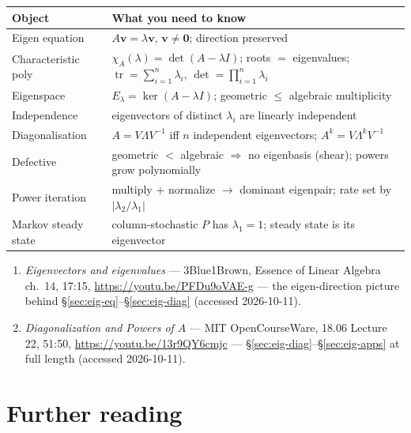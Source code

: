 \begin{center}
\begin{tabularx}{\textwidth}{l>{\raggedright\arraybackslash}X}
\toprule
\textbf{Object} & \textbf{What you need to know}\\
\midrule
Eigen equation & $A\mathbf v=\lambda\mathbf v$, $\mathbf v\ne\mathbf0$;
direction preserved \\
Characteristic poly & $\chi_A(\lambda)=\det(A-\lambda I)$; roots $=$
eigenvalues; $\operatorname{tr}=\sum_{i=1}^{n}\lambda_i$, $\det=\prod_{i=1}^{n}\lambda_i$ \\
Eigenspace & $E_\lambda=\ker(A-\lambda I)$; geometric $\le$ algebraic
multiplicity \\
Independence & eigenvectors of distinct $\lambda_i$ are linearly
independent \\
Diagonalisation & $A=V\Lambda V^{-1}$ iff $n$ independent eigenvectors;
$A^k=V\Lambda^kV^{-1}$ \\
Defective & geometric $<$ algebraic $\Rightarrow$ no eigenbasis (shear);
powers grow polynomially \\
Power iteration & multiply + normalize $\to$ dominant eigenpair;
rate set by $|\lambda_2/\lambda_1|$ \\
Markov steady state & column-stochastic $P$ has $\lambda_1=1$; steady
state is its eigenvector \\
\bottomrule
\end{tabularx}
\end{center}
\begin{rulebox}
\begin{enumerate}
\item \emph{Eigenvectors and eigenvalues} --- 3Blue1Brown, Essence of
Linear Algebra ch.~14, 17:15, \url{https://youtu.be/PFDu9oVAE-g} ---
the eigen-direction picture behind \S\ref{sec:eig-eq}--\S\ref{sec:eig-diag}
(accessed 2026-10-11).
\item \emph{Diagonalization and Powers of $A$} --- MIT OpenCourseWare,
18.06 Lecture 22, 51:50, \url{https://youtu.be/13r9QY6cmjc} ---
\S\ref{sec:eig-diag}--\S\ref{sec:eig-apps} at full length
(accessed 2026-10-11).
\end{enumerate}
\end{rulebox}

\section*{Further reading}

